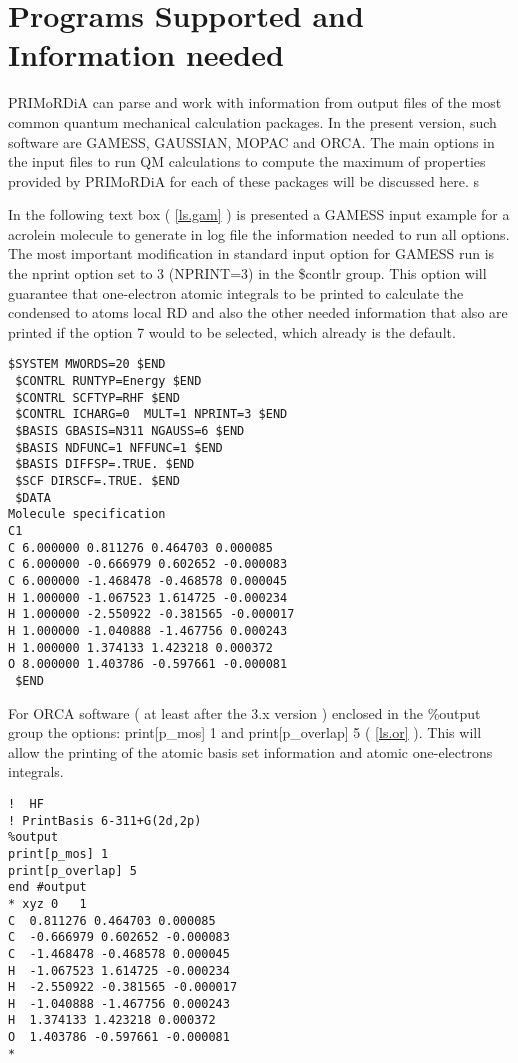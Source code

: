 \documentclass[a4paper,11pt]{refart}
\begin{document}
\section{Programs Supported and Information needed}

PRIMoRDiA can parse and work with information from output files of the most common quantum mechanical calculation packages. In the present version, such software are GAMESS, GAUSSIAN, MOPAC and ORCA. The main options in the input files to run QM calculations to compute the maximum of properties provided by PRIMoRDiA for each of these packages will be discussed here. 
s

In the following text box ( \autoref{ls.gam} ) is presented a GAMESS input example for a acrolein molecule to generate in log file the information needed to run all options. The most important modification in standard input option for GAMESS run is the nprint option set to 3 (NPRINT=3) in the \$contlr group. This option will guarantee that one-electron atomic integrals to be printed to calculate the condensed to atoms local RD and also the other needed information that also are printed if the option 7 would to be selected, which already is the default. 
  
\begin{minipage}{\textwidth}
\begin{lstlisting}[caption={Gamess Input Example},label={ls.gam}]
 $SYSTEM MWORDS=20 $END
 $CONTRL RUNTYP=Energy $END
 $CONTRL SCFTYP=RHF $END
 $CONTRL ICHARG=0  MULT=1 NPRINT=3 $END
 $BASIS GBASIS=N311 NGAUSS=6 $END
 $BASIS NDFUNC=1 NFFUNC=1 $END
 $BASIS DIFFSP=.TRUE. $END
 $SCF DIRSCF=.TRUE. $END
 $DATA
Molecule specification
C1
C 6.000000 0.811276 0.464703 0.000085
C 6.000000 -0.666979 0.602652 -0.000083
C 6.000000 -1.468478 -0.468578 0.000045
H 1.000000 -1.067523 1.614725 -0.000234
H 1.000000 -2.550922 -0.381565 -0.000017
H 1.000000 -1.040888 -1.467756 0.000243
H 1.000000 1.374133 1.423218 0.000372
O 8.000000 1.403786 -0.597661 -0.000081
 $END
\end{lstlisting}
\end{minipage}

For ORCA software ( at least after the 3.x version ) enclosed in the \%output group the options: print[p\_mos] 1 and print[p\_overlap] 5 ( \autoref{ls.or} ). This will allow the printing of the atomic basis set information and atomic one-electrons integrals.

\begin{minipage}{\textwidth}
\begin{lstlisting}[caption={ORCA Input Example},label={ls.or}]
!  HF 
! PrintBasis 6-311+G(2d,2p)
%output
print[p_mos] 1
print[p_overlap] 5 
end #output
* xyz 0   1
C  0.811276 0.464703 0.000085
C  -0.666979 0.602652 -0.000083
C  -1.468478 -0.468578 0.000045
H  -1.067523 1.614725 -0.000234
H  -2.550922 -0.381565 -0.000017
H  -1.040888 -1.467756 0.000243
H  1.374133 1.423218 0.000372
O  1.403786 -0.597661 -0.000081
*
\end{lstlisting}
\end{minipage}
\end{document}
